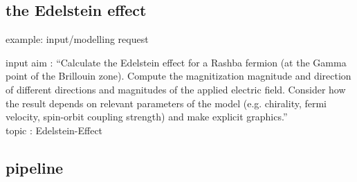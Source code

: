\documentclass[t]{beamer}
\numberwithin{equation}{section}
\begin{document}
	\subsection{the Edelstein effect}
	\begin{frame}[c]{example: input/modelling request}
		\begin{exampleblock}{input}
			\Large aim : \enquote{Calculate the Edelstein effect for a Rashba fermion (at the Gamma point of the Brillouin zone). Compute the magnitization magnitude and direction of different directions and magnitudes of the applied electric field. Consider how the result depends on relevant parameters of the model (e.g. chirality, fermi velocity, spin-orbit coupling strength) and make explicit graphics.}\\
			\bigskip
			topic : Edelstein-Effect\\
		\end{exampleblock}
	\end{frame}
	
	\subsection{pipeline}
	
\end{document}
